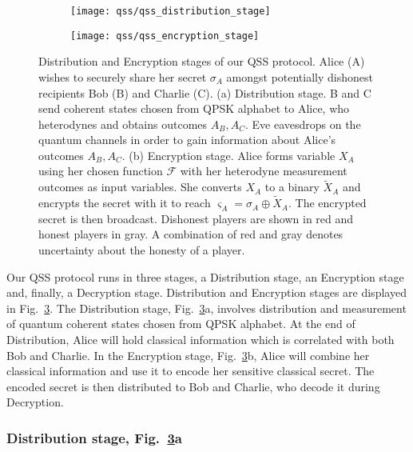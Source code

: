 \begin{figure}[htp]
\captionsetup{width=0.8\linewidth}
\centering
	\begin{subfigure}{0.8\linewidth}
		\centering
		\label{fig:qss_distribution_stage}
		\texttt{[image: qss/qss\_distribution\_stage]}
	\end{subfigure}
	\begin{subfigure}{0.8\linewidth}
		\centering
		\label{fig:qss_encryption_stage}
		\texttt{[image: qss/qss\_encryption\_stage]}
		
	\end{subfigure}
\caption{\label{fig:qss_protocol_cartoon} Distribution and Encryption stages of our QSS protocol. Alice (A) wishes to securely share her secret $\sigma_A$ amongst potentially dishonest recipients Bob (B) and Charlie (C). (a) Distribution stage. B and C send coherent states chosen from QPSK alphabet to Alice, who heterodynes and obtains outcomes $A_B, A_C$. Eve eavesdrops on the quantum channels in order to gain information about Alice's outcomes $A_B, A_C$. (b) Encryption stage. Alice forms variable $X_A$ using her chosen function $\mathcal{F}$ with her heterodyne measurement outcomes as input variables. She converts $X_A$ to a binary $\tilde{X}_A$ and encrypts the secret with it to reach $\varsigma_A = \sigma_A \oplus \tilde{X}_A$. The encrypted secret is then broadcast. Dishonest players are shown in red and honest players in gray. A combination of red and gray denotes uncertainty about the honesty of a player.
}
\end{figure}


Our QSS protocol runs in three stages, a Distribution stage, an Encryption stage and, finally, a Decryption stage. Distribution and Encryption stages are displayed in Fig.~\ref{fig:qss_protocol_cartoon}. The Distribution stage, Fig.~\ref{fig:qss_protocol_cartoon}a, involves distribution and measurement of quantum coherent states chosen from QPSK alphabet. At the end of Distribution, Alice will hold classical information which is correlated with both Bob and Charlie. In the Encryption stage, Fig.~\ref{fig:qss_protocol_cartoon}b, Alice will combine her classical information and use it to encode her sensitive classical secret. The encoded secret is then distributed to Bob and Charlie, who decode it during Decryption. 


\subsubsection*{Distribution stage, Fig.~\ref{fig:qss_protocol_cartoon}a}
